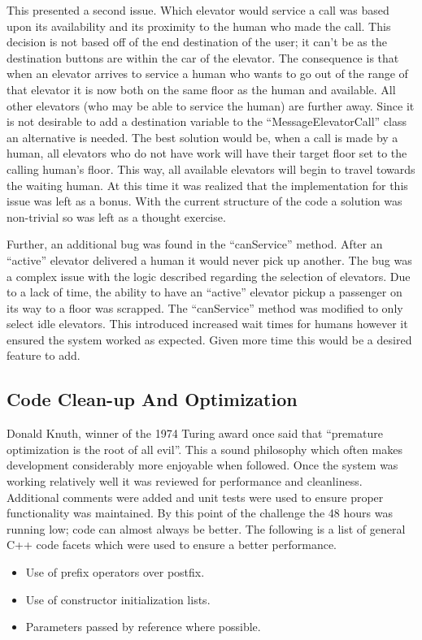 \documentclass{article}
\begin{document}
This presented a second issue.
Which elevator would service a call was based upon its availability and its proximity to the human who made the call.
This decision is not based off of the end destination of the user; it can't be as the destination buttons are within the car of the elevator.
The consequence is that when an elevator arrives to service a human who wants to go out of the range of that elevator it is now both on the same floor as the human and available.
All other elevators (who may be able to service the human) are further away.
Since it is not desirable to add a destination variable to the ``MessageElevatorCall'' class an alternative is needed.
The best solution would be, when a call is made by a human, all elevators who do not have work will have their target floor set to the calling human's floor.
This way, all available elevators will begin to travel towards the waiting human.
At this time it was realized that the implementation for this issue was left as a bonus.
With the current structure of the code a solution was non-trivial so was left as a thought exercise. 

Further, an additional bug was found in the ``canService'' method.
After an ``active'' elevator delivered a human it would never pick up another.
The bug was a complex issue with the logic described regarding the selection of elevators.
Due to a lack of time, the ability to have an ``active'' elevator pickup a passenger on its way to a floor was scrapped.
The ``canService'' method was modified to only select idle elevators. 
This introduced increased wait times for humans however it ensured the system worked as expected.
Given more time this would be a desired feature to add.

\subsection{Code Clean-up And Optimization}
Donald Knuth, winner of the 1974 Turing award once said that ``premature optimization is the root of all evil''.
This a sound philosophy which often makes development considerably more enjoyable when followed.
Once the system was working relatively well it was reviewed for performance and cleanliness.
Additional comments were added and unit tests were used to ensure proper functionality was maintained.
By this point of the challenge the 48 hours was running low; code can almost always be better.
The following is a list of general C++ code facets which were used to ensure a better performance.
\begin{itemize}
	\item Use of prefix operators over postfix.
	\item Use of constructor initialization lists.
	\item Parameters passed by reference where possible.
\end{itemize} 
\end{document}
